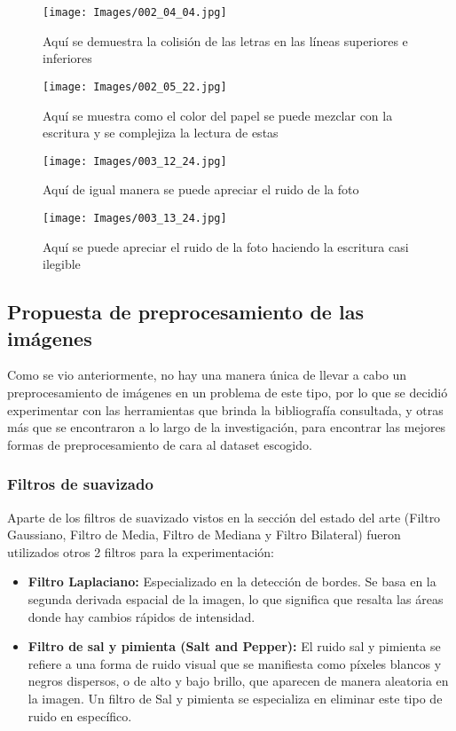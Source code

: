 \documentclass{article}
\begin{document}
\begin{figure}[h]
    \centering
    \texttt{[image: Images/002\_04\_04.jpg]}
    \caption{Aquí se demuestra la colisión de las letras en las líneas superiores e inferiores}
    \label{fig:enter-label}
\end{figure}

\begin{figure}[h]
    \centering
    \texttt{[image: Images/002\_05\_22.jpg]}
    \caption{Aquí se muestra como el color del papel se puede mezclar con la escritura y se complejiza la lectura de estas}
    \label{fig:enter-label}
\end{figure}

\begin{figure}[h]
    \centering
    \texttt{[image: Images/003\_12\_24.jpg]}
    \caption{Aquí de igual manera se puede apreciar el ruido de la foto}
    \label{fig:enter-label}
\end{figure}

\begin{figure}[H]
    \centering
    \texttt{[image: Images/003\_13\_24.jpg]}
    \caption{Aquí se puede apreciar el ruido de la foto haciendo la escritura casi ilegible}
    \label{fig:enter-label}
\end{figure}

\newpage
\subsection{Propuesta de preprocesamiento de las imágenes}
Como se vio anteriormente, no hay una manera única de llevar a cabo un preprocesamiento de imágenes en un problema de este tipo, por lo que se decidió experimentar con las herramientas que brinda la bibliografía consultada, y otras más que se encontraron a lo largo de la investigación, para encontrar las mejores formas de preprocesamiento de cara al dataset escogido.

\subsubsection{Filtros de suavizado}

Aparte de los filtros de suavizado vistos en la sección del estado del arte (Filtro Gaussiano, Filtro de Media, Filtro de Mediana y Filtro Bilateral) fueron utilizados otros 2 filtros para la experimentación:

\begin{itemize}
    \item \textbf{Filtro Laplaciano:} Especializado en la detección de bordes. Se basa en la segunda derivada espacial de la imagen, lo que significa que resalta las áreas donde hay cambios rápidos de intensidad.

    \item \textbf{Filtro de sal y pimienta (Salt and Pepper):} El ruido sal y pimienta se refiere a una forma de ruido visual que se manifiesta como píxeles blancos y negros dispersos, o de alto y bajo brillo, que aparecen de manera aleatoria en la imagen. Un filtro de Sal y pimienta se especializa en eliminar este tipo de ruido en específico.
\end{itemize}
\end{document}
